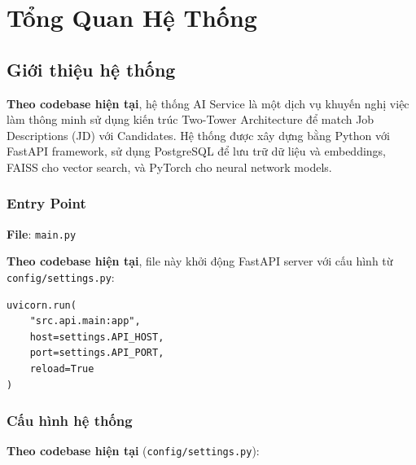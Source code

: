\section{Tổng Quan Hệ Thống}


\subsection{Giới thiệu hệ thống}

\textbf{Theo codebase hiện tại}, hệ thống AI Service là một dịch vụ khuyến nghị việc làm thông minh sử dụng kiến trúc Two-Tower Architecture để match Job Descriptions (JD) với Candidates. Hệ thống được xây dựng bằng Python với FastAPI framework, sử dụng PostgreSQL để lưu trữ dữ liệu và embeddings, FAISS cho vector search, và PyTorch cho neural network models.

\subsubsection{Entry Point}

\textbf{File}: \texttt{main.py}

\textbf{Theo codebase hiện tại}, file này khởi động FastAPI server với cấu hình từ \texttt{config/settings.py}:

\begin{verbatim}
uvicorn.run(
    "src.api.main:app",
    host=settings.API_HOST,
    port=settings.API_PORT,
    reload=True
)
\end{verbatim}

\subsubsection{Cấu hình hệ thống}

\textbf{Theo codebase hiện tại} (\texttt{config/settings.py}):

